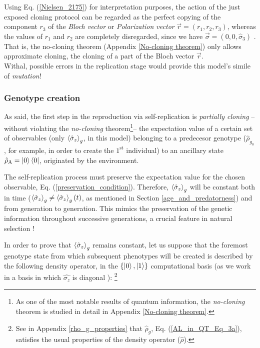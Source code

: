 \documentclass[11pt]{article}
\numberwithin{equation}{section} %
\numberwithin{figure}{section} %
\begin{document}
Using Eq. (\ref{Nielsen_2175}) for interpretation purposes, the action of the just exposed cloning protocol can be regarded as the perfect copying of the component $r_3$ of the \emph{Bloch vector} or \emph{Polarization vector} $\vec{r}=(r_1,r_2,r_3)$, whereas the values of $r_1$ and $r_2$ are completely disregarded, since we have $\vec{\sigma}=(0,0,\hat{\sigma}_3)$ \cite[p.~4, l.~33-35]{Ferraro}. That is, the no-cloning theorem (Appendix \ref{No-cloning theorem}) only allows approximate cloning, the cloning of a %
part of the Bloch vector $\vec{r}$.\\

Withal, possible errors in the replication stage would provide this model's simile of \emph{mutation}! $\,\,$ \cite[p.~2, l.~27]{QAL_IBM} \cite[p.~2, l.~3-4]{AL_in_QT}


\subsubsection{Genotype creation} \label{genotype_replication}

As said, the first step in the reproduction via self-replication is \emph{partially cloning} --without violating the \emph{no-cloning} theorem\footnote{As one of the most notable results of quantum information, the \emph{no-cloning} theorem is studied in detail in Appendix \ref{No-cloning theorem}.}-- the expectation value of a certain set of observables (only $\braket{\hat{\sigma}_z}_g$, in this model) belonging to a predecesor genotype ($\hat{\rho}_{g_0}$, for example, in order to create the $1^\textrm{st}$ individual) to an ancillary state $\hat{\rho}_\textrm{A}=\ket{0}\bra{0}$, originated by the environment. 

The self-replication process must preserve the expectation value for the chosen observable, Eq. (\ref{preservation_condition}). Therefore, $\braket{\hat{\sigma}_z}_g$ will be constant both in time ($\braket{\hat{\sigma}_z}_g\neq\braket{\hat{\sigma}_z}_g(t)$, as mentioned in Section \ref{age_and_predatorness}) and from generation to generation. This mimics the preservation of the genetic information throughout successive generations, a crucial feature in natural selection \cite[p.~2, l.~31-32]{AL_in_QT}!

In order to prove that $\braket{\hat{\sigma}_z}_g$  remains constant, let us suppose that the foremost genotype state from which subsequent phenotypes will be created is described by the following density operator, in the $\{\ket{0},\ket{1}\}$ computational basis (as we work in a basis in which $\hat{\sigma_z}$ is diagonal \cite[p.~2, l.~20-21]{Bio_Cloning}): \footnote{See in Appendix {\ref{rho_g_properties}} that $\hat{\rho}_g$, Eq. (\ref{AL_in_QT_Eq_3a}), satisfies the usual properties of the density operator ($\hat{\rho}$).}
\end{document}
